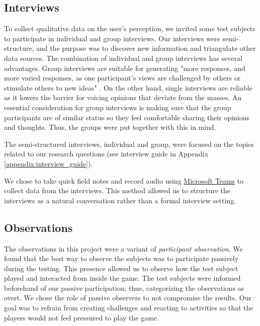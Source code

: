 \subsection{Interviews}
To collect qualitative data on the user’s perception, we invited some test subjects to participate in individual and group interviews. Our interviews were semi-structure, and the purpose was to discover new information and triangulate other data sources. The combination of individual and group interviews has several advantages. Group interviews are suitable for generating "more responses, and more varied responses, as one participant’s views are challenged by others or stimulate others to new ideas" \citep{oates_researching_2006}. On the other hand, single interviews are reliable as it lowers the barrier for voicing opinions that deviate from the masses. An essential consideration for group interviews is making sure that the group participants are of similar status so they feel comfortable sharing their opinions and thoughts. Thus, the groups were put together with this in mind.

The semi-structured interviews, individual and group, were focused on the topics related to our research questions (see interview guide in Appendix \ref{appendix:interview_guide}). 

We chose to take quick field notes and record audio using \href{https://www.microsoft.com/en-ww/microsoft-teams/group-chat-software}{Microsoft Teams} to collect data from the interviews. This method allowed us to structure the interviews as a natural conversation rather than a formal interview setting.

\subsection{Observations}
The observations in this project were a variant of \textit{participant observation}. We found that the best way to observe the subjects was to participate passively during the testing. This presence allowed us to observe how the test subject played and interacted from inside the game. The test subjects were informed beforehand of our passive participation; thus, categorizing the observations as overt. We chose the role of passive observers to not compromise the results. Our goal was to refrain from creating challenges and reacting to activities so that the players would not feel pressured to play the game.

